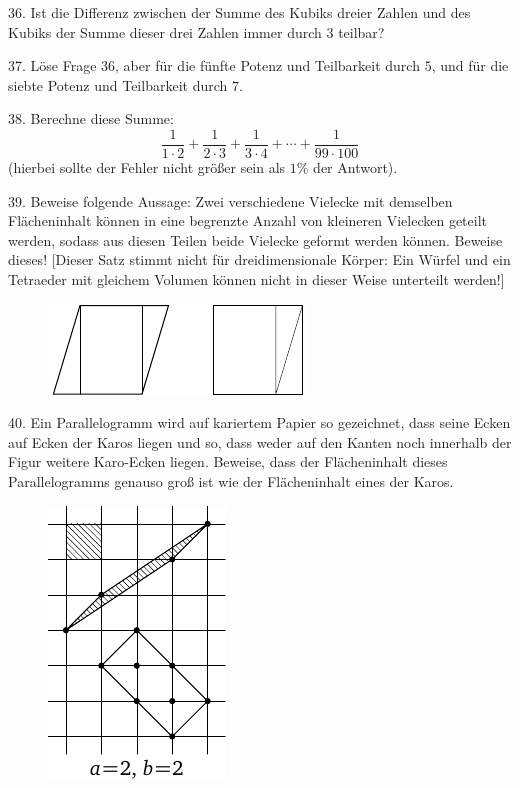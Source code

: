 \begin{problem}{36.}
	Ist die Differenz zwischen der Summe des Kubiks dreier Zahlen und des Kubiks der Summe dieser drei Zahlen immer durch $3$ teilbar?
\end{problem}

\begin{problem}{37.}
	Löse Frage 36, aber für die fünfte Potenz und Teilbarkeit durch $5$, und für die siebte Potenz und Teilbarkeit durch $7$.
\end{problem}

\begin{problem}{38.}
	Berechne diese Summe:
	\begin{equation*}
		\frac{1}{1\cdot 2} + \frac{1}{2\cdot 3} + \frac{1}{3\cdot 4} + \dotsb + \frac{1}{99\cdot 100}
	\end{equation*}
	(hierbei sollte der Fehler nicht größer sein als $1\%$ der Antwort).
\end{problem}

\begin{problem}{39.}
	Beweise folgende Aussage: Zwei verschiedene Vielecke mit demselben Flächeninhalt können in eine begrenzte Anzahl von kleineren Vielecken geteilt werden, sodass aus diesen Teilen beide Vielecke geformt werden können. Beweise dieses! [Dieser Satz stimmt nicht für dreidimensionale Körper: Ein Würfel und ein Tetraeder mit gleichem Volumen können nicht in dieser Weise unterteilt werden!]
	\begin{figure}
		\includegraphics{resources/q39_horizontal}
	\end{figure}
\end{problem}

\begin{problem}{40.}
	Ein Parallelogramm wird auf kariertem Papier so gezeichnet, dass seine Ecken auf Ecken der Karos liegen und so, dass weder auf den Kanten noch innerhalb der Figur weitere Karo-Ecken liegen. Beweise, dass der Flächeninhalt dieses Parallelogramms genauso groß ist wie der Flächeninhalt eines der Karos.
	\begin{figure}
		\includegraphics{resources/taskbook-24}
	\end{figure}
\end{problem}

